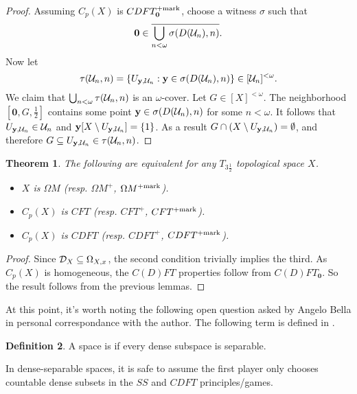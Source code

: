 \documentclass{amsart}
\renewcommand{\vec}{\mathbf}
\theoremstyle{plain}
\newtheorem{theorem}{Theorem}
\theoremstyle{definition}
\newtheorem{definition}[theorem]{Definition}
\theoremstyle{remark}
\theoremstyle{plain}
\theoremstyle{definition}
\theoremstyle{remark}
\begin{document}
\begin{proof}
  Assuming \(C_p(X)\) is \(CDFT_{\vec 0}^{\plusMark}\), choose a witness
  \(\sigma\) such that
  \[
    \vec 0
      \in
    \cl{\bigcup_{n<\omega} \sigma(D(\mc U_n),n)}
  .\]
  Now let
  \[
    \tau(\mc U_n,n)
      =
    \{
      U_{\vec y,\mc U_n}
    :
      \vec y \in \sigma(D(\mc U_n),n)
    \}
      \in
    [\mc U_n]^{<\omega}
  .\]
  We claim that \(\bigcup_{n<\omega}\tau(\mathcal{U}_n,n)\)
  is an \(\omega\)-cover.
  Let \(G\in[X]^{<\omega}\). The neighborhood \([\vec 0,G,\frac{1}{2}]\)
  contains some point \(\vec y\in \sigma(D(\mc U_n),n)\)
  for some \(n<\omega\). It follows
  that \(U_{\vec y,\mc U_n}\in\mc U_n\) and
  \(\vec y[X\setminus U_{\vec y,\mc U_n}]=\{1\}\). As a result
  \(G\cap(X\setminus U_{\vec y,\mc U_n})=\emptyset\), and therefore
  \(G\subseteq U_{\vec y,\mc U_n}\in\mc \tau(\mc U_n,n)\).
\end{proof}

\begin{theorem}\label{mengerFanTheorem}
  The following are equivalent for any \(T_{3\frac{1}{2}}\)
  topological space \(X\).
    \begin{itemize}
      \item \(X\) is \(\Omega M\)
            (resp. \(\Omega M^+\), \(\Omega M^{+\mathrm{mark}}\)).
      \item \(C_p(X)\) is \(CFT\)
            (resp. \(CFT^+\), \(CFT^{+\mathrm{mark}}\)).
      \item \(C_p(X)\) is \(CDFT\)
            (resp. \(CDFT^+\), \(CDFT^{+\mathrm{mark}}\)).
    \end{itemize}
\end{theorem}

\begin{proof}
  Since \(\mathcal{D}_X\subseteq \Omega_{X,x}\), the second condition trivially
  implies the third. As \(C_p(X)\) is homogeneous, the \(C(D)FT\) properties
  follow from \(C(D)FT_{\vec 0}\). So the result follows from the
  previous lemmas.
\end{proof}

At this point, it's worth noting the following open question asked by Angelo Bella
in personal correspondance with the author. The following
term is defined in \cite{MR0370506}.

\begin{definition}
  A space is  if every dense subspace is separable.
\end{definition}

In dense-separable spaces, it is safe to assume the first player
only chooses countable dense subsets in the \(SS\) and \(CDFT\)
principles/games. 
\end{document}
